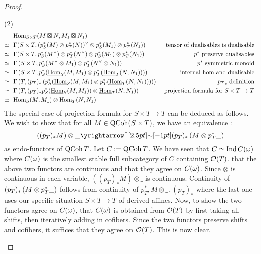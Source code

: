 \documentclass[./main.tex]{subfiles}
\begin{document}
\begin{proof}
\begin{lem}
\begin{proof1}
      (2) \begin{align*}
        &\,\,\,\,\mathrm{Hom}_{S \times T}(M \boxtimes N , M_1 \boxtimes N_1) \\
        \simeq &\,\,\,\, \Gamma(S \times T , 
        (p_S^*(M) \otimes p_T^*(N))^\vee \otimes p_S^*(M_1) \otimes p_T^*(N_1))
        &\text{ tensor of dualisables is dualisable }
        \\
        \simeq &\,\,\,\, \Gamma(S \times T , 
        p_S^*(M^\vee) \otimes p_T^*(N^\vee) \otimes p_S^*(M_1) \otimes p_T^*(N_1))
        &\text{ $p^*$ preserve dualisables }
        \\
        \simeq &\,\,\,\, \Gamma\left(S \times T , 
        p_S^*(M^\vee \otimes M_1) \otimes p_T^*(N^\vee \otimes N_1)\right)
        &\text{ $p^*$ symmetric monoid }
        \\
        \simeq &\,\,\,\, \Gamma\left(S \times T , 
        p_S^*(\underline{\mathrm{Hom}}_S(M , M_1) 
        \otimes p_T^*(\underline{\mathrm{Hom}}_T(N,N_1)))\right)
        &\text{ internal hom and dualisable }
        \\
        \simeq &\,\,\,\, \Gamma\left(T , (p_T)_*\left(
          p_S^*(\underline{\mathrm{Hom}}_S(M , M_1) 
        \otimes p_T^*(\underline{\mathrm{Hom}}_T(N,N_1)))
        \right)\right)
        &\text{ ${p_T}_*$ definition }
        \\
        \simeq &\,\,\,\, \Gamma\left(
          T , (p_T)_* p_S^* (\underline{\mathrm{Hom}}_S(M , M_1))
        \otimes \underline{\mathrm{Hom}}_T(N,N_1)
        \right)
        &\text{ projection formula for $S \times T \to T$ }
        \\
        \simeq &\,\,\,\, \mathrm{Hom}_S(M , M_1) \otimes \mathrm{Hom}_T(N , N_1)
        &\text{ }
      \end{align*}
      The special case of projection formula for $S \times T \to T$
      can be deduced as follows.
      We wish to show that for all $M \in \mathrm{QCoh}(S \times T)$, 
      we have an equivalence : 
      \[
        ((p_T)_* M) \otimes \_ \map{\sim}{} (p_T)_*\brkt{M \otimes p_T^* \_}
      \]
      as endo-functors of $\mathrm{QCoh}\,T$.
      Let $C := \mathrm{QCoh}\,T$. 
      We have seen that $C \simeq \mathrm{Ind}\,C(\omega)$ where
      $C(\omega)$ is the smallest stable full subcategory of $C$ containing
      $\mathcal{O}(T)$.
      that the above two functors are continuous and
      that they agree on $C(\omega)$.
      Since $\otimes$ is continuous in each variable,
      $((p_T)_* M) \otimes \_$ is continuous.
      Continuity of $(p_T)_*\left(M \otimes p_T^* \_\right)$
      follows from continuity of $p_T^*, M \otimes\_ \,, (p_T)_*$
      where the last one uses our specific situation $S \times T \to T$
      of derived affines.
      Now, to show the two functors agree on $C(\omega)$,
       that $C(\omega)$ is obtained from
      $\mathcal{O}(T)$ by first taking all shifts, then iteratively 
      adding in cofibers.
      Since the two functors preserve shifts and cofibers,
      it suffices that they agree on $\mathcal{O}(T)$.
      This is now clear.
    \end{proof1}
  \end{lem}

\end{proof}
\end{document}
